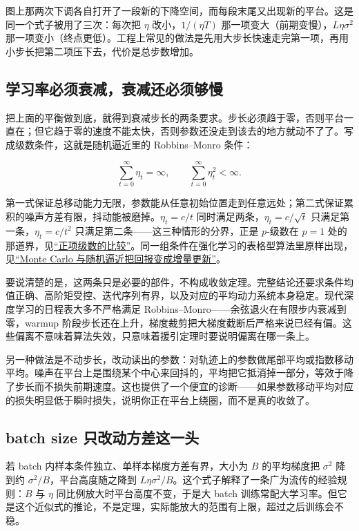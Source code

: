 图上那两次下调各自打开了一段新的下降空间，而每段末尾又出现新的平台。这是同一个式子被用了三次：每次把 \(\eta\) 改小，\(1/(\eta T)\) 那一项变大（前期变慢），\(L\eta\sigma^2\) 那一项变小（终点更低）。工程上常见的做法是先用大步长快速走完第一项，再用小步长把第二项压下去，代价是总步数增加。

\subsection{学习率必须衰减，衰减还必须够慢}

把上面的平衡做到底，就得到衰减步长的两条要求。步长必须趋于零，否则平台一直在；但它趋于零的速度不能太快，否则参数还没走到该去的地方就动不了了。写成级数条件，这就是随机逼近里的 Robbins--Monro 条件：

\[
\sum_{t=0}^{\infty}\eta_t=\infty,\qquad \sum_{t=0}^{\infty}\eta_t^2<\infty .
\]

第一式保证总移动能力无限，参数能从任意初始位置走到任意远处；第二式保证累积的噪声方差有限，抖动能被磨掉。\(\eta_t=c/t\) 同时满足两条，\(\eta_t=c/\sqrt t\) 只满足第一条，\(\eta_t=c/t^2\) 只满足第二条——这三种情形的分界，正是 \(p\)-级数在 \(p=1\) 处的那道界，见\hyperref[sec:02-Calculus/05-Sequences-and-Series/03]{``正项级数的比较''}。同一组条件在强化学习的表格型算法里原样出现，见\hyperref[sec:16-Control-and-Reinforcement-Learning/02-Reinforcement-Learning/03]{``Monte Carlo 与随机逼近把回报变成增量更新''}。

要说清楚的是，这两条只是必要的部件，不构成收敛定理。完整结论还要求条件均值正确、高阶矩受控、迭代序列有界，以及对应的平均动力系统本身稳定。现代深度学习的日程表大多不严格满足 Robbins--Monro——余弦退火在有限步内衰减到零，warmup 阶段步长还在上升，梯度裁剪把大梯度截断后严格来说已经有偏。这些偏离不意味着算法失效，只意味着援引定理时要说明偏离在哪一条上。

另一种做法是不动步长，改动读出的参数：对轨迹上的参数做尾部平均或指数移动平均。噪声在平台上是围绕某个中心来回抖的，平均把它抵消掉一部分，等效于降了步长而不损失前期速度。这也提供了一个便宜的诊断——如果参数移动平均对应的损失明显低于瞬时损失，说明你正在平台上绕圈，而不是真的收敛了。

\subsection{batch size 只改动方差这一头}

若 batch 内样本条件独立、单样本梯度方差有界，大小为 \(B\) 的平均梯度把 \(\sigma^2\) 降到约 \(\sigma^2/B\)，平台高度随之降到 \(L\eta\sigma^2/B\)。这个式子解释了一条广为流传的经验规则：\(B\) 与 \(\eta\) 同比例放大时平台高度不变，于是大 batch 训练常配大学习率。但它是这个近似式的推论，不是定理，实际能放大的范围有上限，超过之后训练会不稳。

